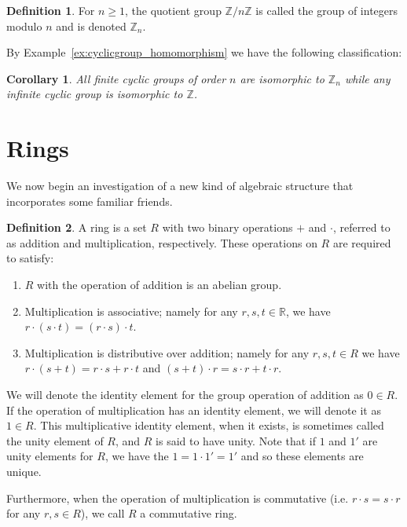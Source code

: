 \documentclass[12pt,letterpaper,DIV=11,final]{scrartcl}
\theoremstyle{plain}
\newtheorem{corollary}{Corollary}
\theoremstyle{definition}
\newtheorem{definition}{Definition}[section]
\theoremstyle{remark}
\begin{document}
\begin{definition}
  For $n \geq 1$, the quotient group $\mathbb{Z}/n \mathbb{Z}$ is called the group of integers modulo $n$ and is denoted $\mathbb{Z}_n$.
\end{definition}

By Example~\ref{ex:cyclicgroup_homomorphism} we have the following classification:

\begin{corollary}
  All finite cyclic groups of order $n$ are isomorphic to $\mathbb{Z}_n$ while any infinite cyclic group is isomorphic to $\mathbb{Z}$.
\end{corollary}

\section{Rings}
We now begin an investigation of a new kind of algebraic structure that incorporates some familiar friends.

\begin{definition}
  A ring is a set $R$ with two binary operations $+$ and $\cdot$, referred to as addition and multiplication, respectively.
  These operations on $R$ are required to satisfy:
  \begin{enumerate}
    \item $R$ with the operation of addition is an abelian group.
    \item Multiplication is associative; namely for any $r, s, t \in \mathbb{R}$, we have $r \cdot (s \cdot t) = (r \cdot s) \cdot t$.
    \item Multiplication is distributive over addition; namely for any $r, s, t \in R$ we have $r \cdot (s + t) = r \cdot s + r \cdot t$ and $(s + t) \cdot r = s \cdot r + t \cdot r$.
  \end{enumerate}
\end{definition}

We will denote the identity element for the group operation of addition as $0 \in R$.
If the operation of multiplication has an identity element, we will denote it as $1 \in R$.
This multiplicative identity element, when it exists, is sometimes called the unity element of $R$,
and $R$ is said to have unity.
Note that if $1$ and $1'$ are unity elements for $R$, we have the $1 = 1 \cdot 1' = 1'$ and so these elements are unique.

Furthermore, when the operation of multiplication is commutative (i.e. $r \cdot s = s \cdot r$ for any $r, s \in R$), we call $R$ a commutative ring.
\end{document}
